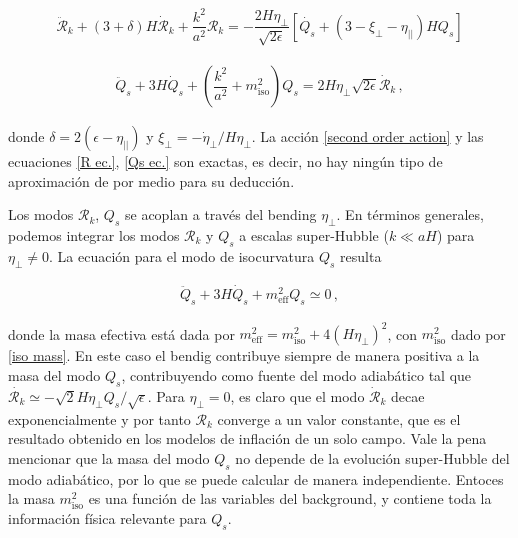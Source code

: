 \documentclass[12pt,a4paper,english,nofootinbib]{revtex4}
\newcommand{\beq}{\begin{eqnarray}}
\newcommand{\enq}{\end{eqnarray}}
\begin{document}
\beq 
    \ddot{\mathcal{R}}_k + (3 + \delta)H\dot{\mathcal{R}}_k  + \dfrac{k^2}{a^2}\mathcal{R}_k = -\dfrac{2 H \eta_\perp}{\sqrt{2\epsilon}} [\dot{Q_s} + (3-\xi_\perp - \eta_{||} )HQ_s]
    \label{R ec.}
\enq 

\beq
    \ddot{Q}_s + 3H\dot{Q}_s + \left(\dfrac{k^2}{a^2} + m_\mathrm{iso}^2\right) Q_s = 2 H \eta_\perp \sqrt{2\epsilon} \dot{\mathcal{R}}_k\,,
    \label{Qs ec.}
\enq 

donde $\delta = 2(\epsilon - \eta_{||})$ y  $\xi_\perp = -\dot{\eta}_\perp/H\eta_\perp$. La acción \eqref{second order action} y las ecuaciones \eqref{R ec.}, \eqref{Qs ec.} son exactas, es decir, no hay ningún tipo de aproximación de por medio para su deducción. 

Los modos $\mathcal{R}_k$, $Q_s$ se acoplan a través del bending $\eta_\perp$.  En términos generales, podemos integrar los modos $\mathcal{R}_k$ y $Q_s$ a escalas super-Hubble ($k\ll aH$) para $\eta_\perp \neq 0$. La ecuación para el modo de isocurvatura $Q_s$ resulta


\beq  
    \ddot{Q}_s + 3H\dot{Q}_s + m_\text{eff}^2 Q_s \simeq 0\,,
\enq

donde la masa efectiva está dada por $m_\text{eff}^2 = m_\text{iso}^2 + 4(H\eta_\perp)^2$, con $m_\text{iso}^2$ dado por \eqref{iso mass}. En este caso el bendig contribuye siempre de manera positiva a la masa del modo $Q_s$, contribuyendo como fuente del modo adiabático tal que $\dot{\mathcal{R}_k}\simeq - \sqrt{2}H\eta_\perp Q_s/\sqrt{\epsilon}$.  Para $\eta_\perp = 0$, es claro que el modo $\dot{\mathcal{R}}_k$ decae exponencialmente y por tanto $\mathcal{R}_k$ converge a un valor constante, que es el resultado  obtenido en los modelos de inflación de un solo campo. Vale la pena mencionar que la masa del modo $Q_s$ no depende de la evolución super-Hubble del modo adiabático, por lo que se puede calcular de manera independiente. Entoces la masa $m_\text{iso}^2$ es una función de las variables del background, y contiene toda la información física relevante para  $Q_s$. 
\end{document}
